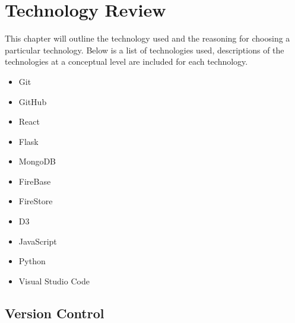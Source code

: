\chapter{Technology Review}
This chapter will outline the technology used and the reasoning for choosing a particular technology. Below is a list of technologies used, descriptions of the technologies at a conceptual level are included for each technology.
\begin{itemize}
\item Git
\item GitHub
\item React
\item Flask
\item MongoDB
\item FireBase
\item FireStore
\item D3
\item JavaScript
\item Python
\item Visual Studio Code


\end{itemize}

\section{Version Control}
